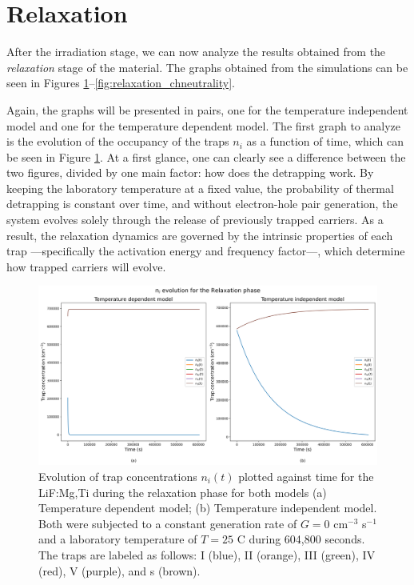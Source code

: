 \section{Relaxation}

After the irradiation stage, we can now analyze the results obtained from the \textit{relaxation} stage of the material. The graphs obtained from the simulations can be seen in Figures \ref{fig:relaxation_nievolution}--\ref{fig:relaxation_chneutrality}.

\vspace{10pt}

Again, the graphs will be presented in pairs, one for the temperature independent model and one for the temperature dependent model. The first graph to analyze is the evolution of the occupancy of the traps $n_i$ as a function of time, which can be seen in Figure \ref{fig:relaxation_nievolution}. At a first glance, one can clearly see a difference between the two figures, divided by one main factor: how does the detrapping work. By keeping the laboratory temperature at a fixed value, the probability of thermal detrapping is constant over time, and without electron-hole pair generation, the system evolves solely through the release of previously trapped carriers. As a result, the relaxation dynamics are governed by the intrinsic properties of each trap ---specifically the activation energy and frequency factor---, which determine how trapped carriers will evolve. 

\vspace{10pt}

\begin{figure}
    \centering
    \includegraphics[width=\textwidth]{Images/Relaxation n_i evolution.png}
    \caption[Trap occupancy evolution during the relaxation phase for both models.]{Evolution of trap concentrations $n_i(t)$  plotted against time for the LiF:Mg,Ti during the relaxation phase for both models (a) Temperature dependent model; (b) Temperature independent model. Both were subjected to a constant generation rate of $G = 0$ cm$^{-3}$ s$^{-1}$ and a laboratory temperature of $T = 25$ \textdegree C during 604,800 seconds. The traps are labeled as follows: I (blue), II (orange), III (green), IV (red), V (purple), and s (brown).}
    \label{fig:relaxation_nievolution}
\end{figure}

